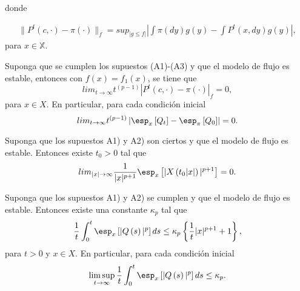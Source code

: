 donde

\begin{eqnarray*}
\parallel
P^{t}\left(c,\cdot\right)-\pi\left(\cdot\right)\parallel_{f}=sup_{|g\leq
f|}|\int\pi\left(dy\right)g\left(y\right)-\int
P^{t}\left(x,dy\right)g\left(y\right)|,
\end{eqnarray*}
para $x\in\mathbb{X}$.

\begin{Teo}\label{Tma.6.3}
Suponga que se cumplen los supuestos (A1)-(A3) y que el modelo de
flujo es estable, entonces con
$f\left(x\right)=f_{1}\left(x\right)$, se tiene que
\[lim_{t\rightarrow\infty}t^{(p-1)}\left|P^{t}\left(c,\cdot\right)-\pi\left(\cdot\right)\right|_{f}=0,\]
para $x\in X$. En particular, para cada condici\'on inicial
\[lim_{t\rightarrow\infty}t^{(p-1)}\left|\esp_{x}\left[Q_{t}\right]-\esp_{\pi}\left[Q_{0}\right]\right|=0.\]
\end{Teo}



\begin{Prop}\label{Prop.5.1.DaiSean}
Suponga que los supuestos A1) y A2) son ciertos y que el modelo de
flujo es estable. Entonces existe $t_{0}>0$ tal que
\begin{equation}
lim_{|x|\rightarrow\infty}\frac{1}{|x|^{p+1}}\esp_{x}\left[|X\left(t_{0}|x|\right)|^{p+1}\right]=0.
\end{equation}
\end{Prop}


\begin{Teo}\label{Tma.5.5.DaiSean}
Suponga que los supuestos A1) y A2) se cumplen y que el modelo de
flujo es estable. Entonces existe una constante $\kappa_{p}$ tal
que
\begin{equation}
\frac{1}{t}\int_{0}^{t}\esp_{x}\left[|Q\left(s\right)|^{p}\right]ds\leq\kappa_{p}\left\{\frac{1}{t}|x|^{p+1}+1\right\},
\end{equation}
para $t>0$ y $x\in X$. En particular, para cada condici\'on
inicial
\begin{eqnarray*}
\limsup_{t\rightarrow\infty}\frac{1}{t}\int_{0}^{t}\esp_{x}\left[|Q\left(s\right)|^{p}\right]ds\leq\kappa_{p}.
\end{eqnarray*}
\end{Teo}


